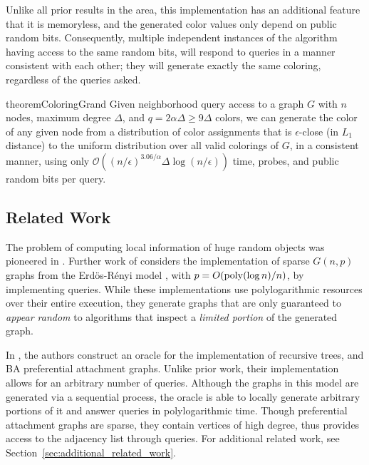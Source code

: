 Unlike all prior results in the area, this implementation has an additional feature that it is memoryless,
and the generated color values only depend on public random bits.
Consequently, multiple independent instances of the algorithm having access to the same random bits,
will respond to queries in a manner consistent with each other; they will generate exactly the same coloring, regardless of the queries asked.

\begin{restatable}{theorem}{ColoringGrand}
\label{thm:coloring_grand}
Given neighborhood query access to a graph $G$ with $n$ nodes, maximum degree $\Delta$, and $q=2\alpha\Delta \ge 9\Delta$ colors,
we can generate the color of any given node from a distribution of color assignments that is $\epsilon$-close (in $L_1$ distance)
to the uniform distribution over all valid colorings of $G$, in a consistent manner,
using only $\mathcal O((n/\epsilon)^{3.06/\alpha}\Delta\log (n/\epsilon))$ time, probes, and public random bits per query.
\end{restatable}




\subsection{Related Work}
\label{sec:related_work}
The problem of computing local information of huge random objects was pioneered in \cite{huge_old,huge}.
Further work of \cite{sparse} considers the implementation of sparse $G(n,p)$ graphs from the Erd\"{o}s-R\'{e}nyi model \cite{er},
with $p = O(\mathrm{poly}(\log n)/n)$, by implementing  queries.
While these implementations use polylogarithmic resources over their entire execution,
they generate graphs that are only guaranteed to \emph{appear random} to algorithms that inspect a \emph{limited portion} of the generated graph.

In \cite{reut}, the authors construct an oracle for the implementation of recursive trees, and BA preferential attachment graphs.
Unlike prior work, their implementation allows for an arbitrary number of queries.
Although the graphs in this model are generated via a sequential process,
the oracle is able to locally generate arbitrary portions of it and answer queries in polylogarithmic time.
Though preferential attachment graphs are sparse, they contain vertices of high degree,
thus \cite{reut} provides access to the adjacency list through  queries.
For additional related work, see Section~\ref{sec:additional_related_work}.



